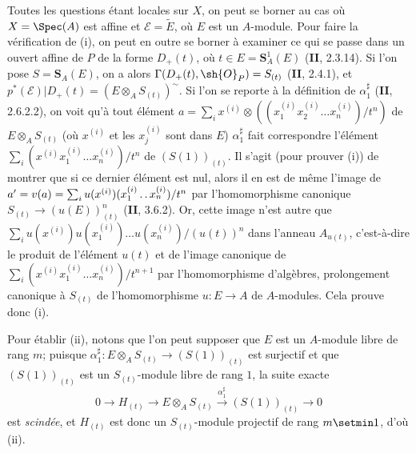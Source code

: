 Toutes les questions étant locales sur $X$, on peut se borner au cas où $X=\Spec(A)$ est affine et $\mathscr E=\widetilde E$, où $E$ est un $A$-module. Pour faire la vérification de (i), on peut en outre se borner à examiner ce qui se passe dans un ouvert affine de $P$ de la forme $D_+(t)$, où $t\in E=\mathbf S_A^1(E)$ (\textbf{II}, 2.3.14). Si l'on pose $S=\mathbf S_A(E)$, on a alors $\Gamma(D_+(t),\sh{O}_P)=S_{(t)}$ (\textbf{II}, 2.4.1), et $p^*(\mathscr E)|D_+(t)=(E\otimes_A S_{(t)})^\sim$. Si l'on se reporte à la définition de $\alpha_1^{\sharp}$ (\textbf{II}, 2.6.2.2), on voit qu'à tout élément $a=\sum_i x^{(i)}\otimes((x_1^{(i)}x_2^{(i)}\ldots x_n^{(i)})/t^n)$ de $E\otimes_A S_{(t)}$ (où $x^{(i)}$ et les $x_j^{(i)}$ sont dans $E$) $\alpha_1^{\sharp}$ fait correspondre l'élément $\sum_i(x^{(i)}x_1^{(i)}\ldots x_n^{(i)})/t^n$ de $(S(1))_{(t)}$. Il s'agit (pour prouver (i)) de montrer que si ce dernier élément est nul, alors il en est de même l'image de $a'=v(a)=\sum_i u(x^{(i)})(x_1^{(i)}\mathinner{\ldotp\ldotp}x_n^{(i)})/t^n$ par l'homomorphisme canonique $S_{(t)}\to(u(E))^n_{(t)}$ (\textbf{II}, 3.6.2). Or, cette image n'est autre que $\sum_i u(x^{(i)})u(x_1^{(i)})\ldots u(x_n^{(i)})/(u(t))^n$ dans l'anneau $A_{u(t)}$, c'est-à-dire le produit de l'élément $u(t)$ et de l'image canonique de $\sum_i(x^{(i)}x_1^{(i)}\ldots x_n^{(i)})/t^{n+1}$ par l'homomorphisme d'algèbres, prolongement canonique à $S_{(t)}$ de l'homomorphisme $u:E\to A$ de $A$-modules. Cela prouve donc (i).

Pour établir (ii), notons que l'on peut supposer que $E$ est un $A$-module libre de rang $m$; puisque $\alpha_1^{\sharp}:E\otimes_A S_{(t)}\to(S(1))_{(t)}$ est surjectif et que $(S(1))_{(t)}$ est un $S_{(t)}$-module libre de rang $1$, la suite exacte
\[
  0\longrightarrow H_{(t)}\longrightarrow E\otimes_A S_{(t)}\xrightarrow{\alpha_1^{\sharp}}(S(1))_{(t)}\longrightarrow0
\]
est \emph{scindée}, et $H_{(t)}$ est donc un $S_{(t)}$-module projectif de rang $m\setmin 1$, d'où (ii).

